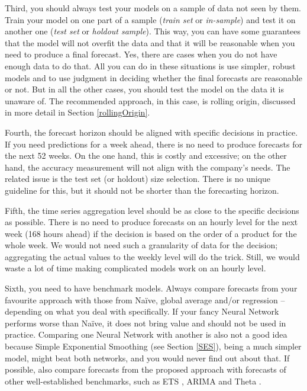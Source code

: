 \documentclass[
]{book}
\theoremstyle{definition}
\theoremstyle{definition}
\theoremstyle{definition}
\theoremstyle{definition}
\theoremstyle{remark}
\begin{document}
Third, you should always test your models on a sample of data not seen by them. Train your model on one part of a sample (\emph{train set} or \emph{in-sample}) and test it on another one (\emph{test set} or \emph{holdout sample}). This way, you can have some guarantees that the model will not overfit the data and that it will be reasonable when you need to produce a final forecast. Yes, there are cases when you do not have enough data to do that. All you can do in these situations is use simpler, robust models \citetext{\citealp[for example, damped trend exponential smoothing by][]{Roberts1982}; \citealp[and][]{Gardner1985a}; \citealp[or Theta by][]{Assimakopoulos2000}} and to use judgment in deciding whether the final forecasts are reasonable or not. But in all the other cases, you should test the model on the data it is unaware of. The recommended approach, in this case, is rolling origin, discussed in more detail in Section \ref{rollingOrigin}.

Fourth, the forecast horizon should be aligned with specific decisions in practice. If you need predictions for a week ahead, there is no need to produce forecasts for the next 52 weeks. On the one hand, this is costly and excessive; on the other hand, the accuracy measurement will not align with the company's needs. The related issue is the test set (or holdout) size selection. There is no unique guideline for this, but it should not be shorter than the forecasting horizon.

Fifth, the time series aggregation level should be as close to the specific decisions as possible. There is no need to produce forecasts on an hourly level for the next week (168 hours ahead) if the decision is based on the order of a product for the whole week. We would not need such a granularity of data for the decision; aggregating the actual values to the weekly level will do the trick. Still, we would waste a lot of time making complicated models work on an hourly level.

Sixth, you need to have benchmark models. Always compare forecasts from your favourite approach with those from Naïve, global average and/or regression -- depending on what you deal with specifically. If your fancy Neural Network performs worse than Naïve, it does not bring value and should not be used in practice. Comparing one Neural Network with another is also not a good idea because Simple Exponential Smoothing (see Section \ref{SES}), being a much simpler model, might beat both networks, and you would never find out about that. If possible, also compare forecasts from the proposed approach with forecasts of other well-established benchmarks, such as ETS \citep{Hyndman2008b}, ARIMA \citep{Box1976} and Theta \citep{Assimakopoulos2000}.
\end{document}
